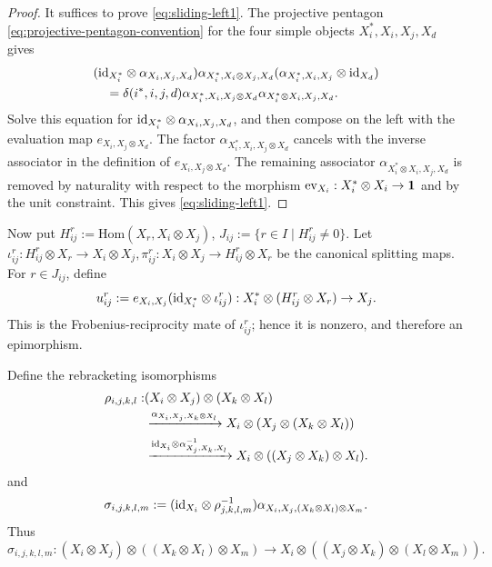 \documentclass[12pt]{amsart}
\numberwithin{equation}{section}
\theoremstyle{definition}
\newcommand{\Hom}{\text{Hom}}
\newcommand{\1}{_{(1)}}
\newcommand{\2}{_{(2)}}
\newcommand{\3}{_{(3)}}
\newcommand{\4}{_{(4)}}
\newcommand{\5}{_{(5)}}
\newcommand{\6}{_{(6)}}
\theoremstyle{plain}
\theoremstyle{definition}
\theoremstyle{remark}
\def\Hom{\mathrm{Hom}}
\begin{document}
\begin{proof}
It suffices to prove \eqref{eq:sliding-left1}. The projective pentagon
\eqref{eq:projective-pentagon-convention} for the four simple objects
\(X_i^*,X_i,X_j,X_d\) gives
\begin{equation*}
\begin{aligned}
&({\rm id}_{X_i^*}\otimes \alpha_{X_i,X_j,X_d})
 \alpha_{X_i^*,X_i\otimes X_j,X_d}
 (\alpha_{X_i^*,X_i,X_j}\otimes{\rm id}_{X_d})\\
&\quad =
\delta(i^*,i,j,d)
\alpha_{X_i^*,X_i,X_j\otimes X_d}
\alpha_{X_i^*\otimes X_i,X_j,X_d}.
\end{aligned}
\end{equation*}
Solve this equation for
\({\rm id}_{X_i^*}\otimes\alpha_{X_i,X_j,X_d}\), and then compose on the left
with the evaluation map \(e_{X_i,X_j\otimes X_d}\).  The factor
\(\alpha_{X_i^*,X_i,X_j\otimes X_d}\) cancels with the inverse associator in the
definition of \(e_{X_i,X_j\otimes X_d}\).  The remaining associator
\(\alpha_{X_i^*\otimes X_i,X_j,X_d}\) is removed by naturality with respect to the morphism
\(\operatorname{ev}_{X_i}:X_i^*\otimes X_i\to{\bf 1}\)
 and by the unit constraint.
This gives \eqref{eq:sliding-left1}.
\end{proof}

Now put $H^r_{ij}:=\Hom(X_r,X_i\otimes X_j)$,
        $J_{ij}:=\{r\in I\mid H^r_{ij}\ne 0\}$.
Let
$
        \iota^r_{ij}:H^r_{ij}\otimes X_r\to X_i\otimes X_j,
        \pi^r_{ij}:X_i\otimes X_j\to H^r_{ij}\otimes X_r
$
be the canonical splitting maps. For \(r\in J_{ij}\), define
\begin{equation}
\label{eq:uijr}
        u^r_{ij}:=
        e_{X_i,X_j}({\rm id}_{X_i^*}\otimes\iota^r_{ij}):
        X_i^*\otimes(H^r_{ij}\otimes X_r)\to X_j .
\end{equation}
This is the Frobenius-reciprocity mate of \(\iota^r_{ij}\); hence it is
nonzero, and therefore an epimorphism.

Define the rebracketing isomorphisms
\begin{equation}
\label{eq:rho-fixed-final}
\begin{aligned}
\rho_{i,j,k,l}:&
        (X_i\otimes X_j)\otimes(X_k\otimes X_l)\\
&\xrightarrow{\alpha_{X_i,X_j,X_k\otimes X_l}}
        X_i\otimes(X_j\otimes(X_k\otimes X_l))\\
&\xrightarrow{{\rm id}_{X_i}\otimes\alpha^{-1}_{X_j,X_k,X_l}}
        X_i\otimes((X_j\otimes X_k)\otimes X_l).
\end{aligned}
\end{equation}
and 
\begin{equation}
\label{eq:sigma-fixed-final}
        \sigma_{i,j,k,l,m}:=
        ({\rm id}_{X_i}\otimes\rho^{-1}_{j,k,l,m})
        \alpha_{X_i,X_j,(X_k\otimes X_l)\otimes X_m}.
\end{equation}
Thus  
\begin{equation*}
  \sigma_{i,j,k,l,m}:      (X_i\otimes X_j)\otimes((X_k\otimes X_l)\otimes X_m)
        \longrightarrow
        X_i\otimes((X_j\otimes X_k)\otimes(X_l\otimes X_m)).
\end{equation*}
\end{document}
